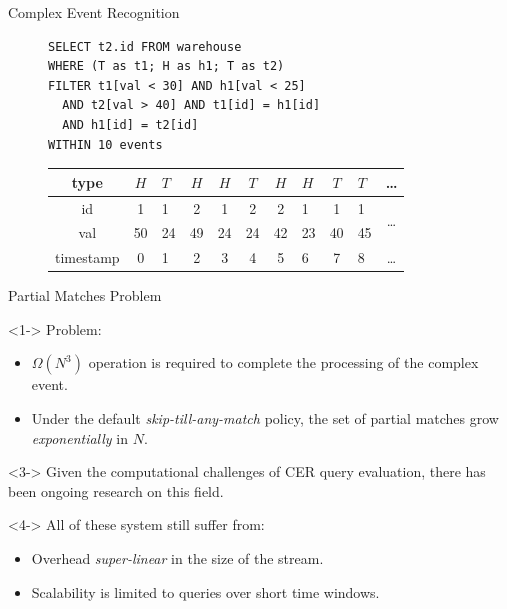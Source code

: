 \documentclass[xcolor=pdftex,dvipsnames,table]{beamer}
\begin{document}
\begin{frame}{Complex Event Recognition}
 \framebreak

 \begin{block}{}
    \begin{figure}[H]
      \begin{verbatim}
SELECT t2.id FROM warehouse
WHERE (T as t1; H as h1; T as t2)
FILTER t1[val < 30] AND h1[val < 25]
  AND t2[val > 40] AND t1[id] = h1[id]
  AND h1[id] = t2[id]
WITHIN 10 events
      \end{verbatim}
    \end{figure}
    \begin{figure}[H]
      \centering
      \begin{tabular}{|c|c|a|c|c|c|c|a|c|a|c}\hline
        type  &$H$&$T$&$H$&$H$&$T$&$H$&$H$&$T$&$T$ & \ldots \\ \hline
        id  & 1 & 1 & 2 & 1 & 2 & 2 & 1 & 1 & 1 &  \\
        val & 50 & 24& 49& 24& 24& 42& 23& 40& 45\\ \hline
        timestamp & 0 & 1 & 2 & 3 & 4 & 5 & 6 & 7 & 8 & \ldots \\ \hline
      \end{tabular}
    \end{figure}
 \end{block}
\end{frame}


\begin{frame}{Partial Matches Problem}
 \begin{block}<1->{}
   Problem:
   \begin{itemize}
     \item<1-> $\Omega(N^{3})$ operation is required to complete the processing of the complex event.
     \item<2-> Under the default \emph{skip-till-any-match} \cite{skip-till-any-match} policy, the set of partial matches grow \emph{exponentially} in $N$.
   \end{itemize}
 \end{block}
 \begin{block}<3->{}
   Given the computational challenges of CER query evaluation, there has been ongoing research on this field.
 \end{block}
 \begin{block}<4->{}
   All of these system still suffer from:
   \begin{itemize}
     \item<4-> Overhead \emph{super-linear} in the size of the stream.
     \item<5-> Scalability is limited to queries over short time windows.
   \end{itemize}
 \end{block}
\end{frame}
\end{document}
